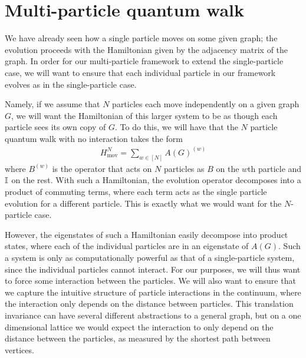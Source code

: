 \documentclass[../thesis-main/thesis-main]{subfiles}
\begin{document}

\section{Multi-particle quantum walk}

We have already seen how a single particle moves on some given graph; the evolution proceeds with the Hamiltonian given by the adjacency matrix of the graph.  In order for our multi-particle framework to extend the single-particle case, we will want to ensure that each individual particle in our framework evolves as in the single-particle case.

Namely, if we assume that $N$ particles each move independently on a given graph $G$, we will want the Hamiltonian of this larger system to be as though each particle sees its own copy of $G$.  To do this, we will have that the $N$ particle quantum walk with no interaction takes the form
\begin{align}
  H_{\text{mov}}^N = \sum_{w\in [N]} A(G)^{(w)}
\end{align}
where $B^{(w)}$ is the operator that acts on $N$ particles as $B$ on the $w$th particle and $\mathbb{I}$ on the rest.  With such a Hamiltonian, the evolution operator decomposes into a product of commuting terms, where each term acts as the single particle evolution for a different particle.  This is exactly what we would want for the $N$-particle case.

However, the eigenstates of such a Hamiltonian easily decompose into product states, where each of the individual particles are in an eigenstate of $A(G)$.  Such a system is only as computationally powerful as that of a single-particle system, since the individual particles cannot interact.  For our purposes, we will thus want to force some interaction between the particles. We will also want to ensure that we capture the intuitive structure of particle interactions in the continuum, where the interaction only depends on the distance between particles.  This translation invariance can have several different abstractions to a general graph, but on a one dimensional lattice we would expect the interaction to only depend on the distance between the particles, as measured by the shortest path between vertices.
\end{document}
